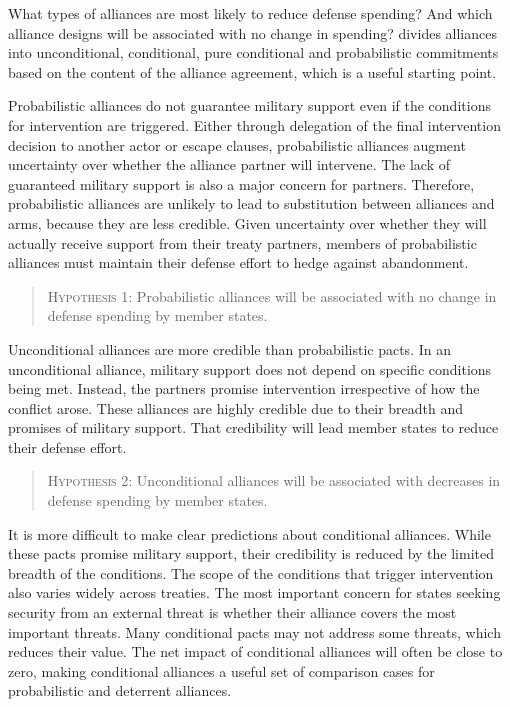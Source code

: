 \documentclass[12pt]{article}
\begin{document}
What types of alliances are most likely to reduce defense spending? And which alliance designs will be associated with no change in spending? \citet{Benson2011, Benson2012} divides alliances into unconditional, conditional, pure conditional and probabilistic commitments based on the content of the alliance agreement, which is a useful starting point. 

Probabilistic alliances do not guarantee military support even if the conditions for intervention are triggered. Either through delegation of the final intervention decision to another actor or escape clauses, probabilistic alliances augment uncertainty over whether the alliance partner will intervene. The lack of guaranteed military support is also a major concern for partners. Therefore, probabilistic alliances are unlikely to lead to substitution between alliances and arms, because they are less credible. Given uncertainty over whether they will actually receive support from their treaty partners, members of probabilistic alliances must maintain their defense effort to hedge against abandonment. 

\begin{quote}
\textsc{Hypothesis 1}: Probabilistic alliances will be associated with no change in defense spending by member states. 
\end{quote}

Unconditional alliances are more credible than probabilistic pacts. In an unconditional alliance, military support does not depend on specific conditions being met. Instead, the partners promise intervention irrespective of how the conflict arose. These alliances are highly credible due to their breadth and promises of military support. That credibility will lead member states to reduce their defense effort. 

\begin{quote}
\textsc{Hypothesis 2}: Unconditional alliances will be associated with decreases in defense spending by member states. 
\end{quote} 

It is more difficult to make clear predictions about conditional alliances. While these pacts promise military support, their credibility is reduced by the limited breadth of the conditions. The scope of the conditions that trigger intervention also varies widely across treaties. The most important concern for states seeking security from an external threat is whether their alliance covers the most important threats. Many conditional pacts may not address some threats, which reduces their value. The net impact of conditional alliances will often be close to zero, making conditional alliances a useful set of comparison cases for probabilistic and deterrent alliances. 
\end{document}
